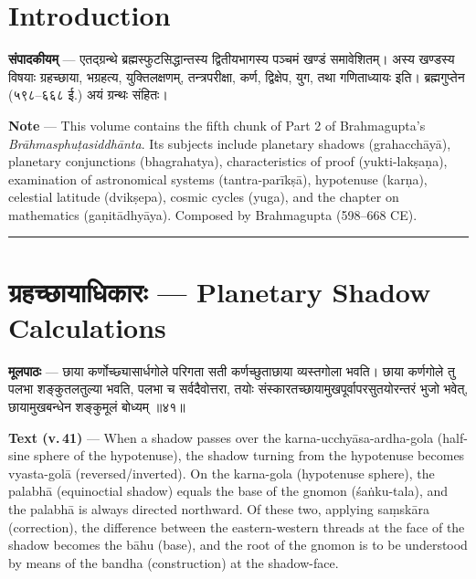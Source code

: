 \documentclass[11pt,a4paper]{article}
\newcommand{\dev}[1]{{\devanagarifont #1}}
\newenvironment{bilingual}{%
  \par\noindent
  \begin{minipage}[t]{0.47\textwidth}%
}{%
  \par\end{minipage}%
}
\newcommand{\rightcol}{%
  \par\end{minipage}%
  \hfill
  \begin{minipage}[t]{0.47\textwidth}%
}
\begin{document}
\section*{Introduction}

\begin{bilingual}
\textbf{संपादकीयम्} --- एतद्ग्रन्थे ब्रह्मस्फुटसिद्धान्तस्य द्वितीयभागस्य पञ्चमं खण्डं समावेशितम्। अस्य खण्डस्य विषयाः ग्रहच्छाया, भग्रहत्य, युक्तिलक्षणम्, तन्त्रपरीक्षा, कर्ण, द्विक्षेप, युग, तथा गणिताध्यायः इति। ब्रह्मगुप्तेन (५९८--६६८ ई.) अयं ग्रन्थः संहितः।
\rightcol
\textbf{Note} --- This volume contains the fifth chunk of Part 2 of Brahmagupta's \textit{Brāhmasphuṭasiddhānta}. Its subjects include planetary shadows (grahacchāyā), planetary conjunctions (bhagrahatya), characteristics of proof (yukti-lakṣaṇa), examination of astronomical systems (tantra-parīkṣā), hypotenuse (karṇa), celestial latitude (dvikṣepa), cosmic cycles (yuga), and the chapter on mathematics (gaṇitādhyāya). Composed by Brahmagupta (598--668 CE).
\end{bilingual}

\medskip
\noindent\rule{\textwidth}{0.4pt}


\section[\dev{ग्रहच्छायाधिकारः}]{\dev{ग्रहच्छायाधिकारः} --- Planetary Shadow Calculations}

\begin{bilingual}
\textbf{मूलपाठः} --- छाया कर्णोच्छ्यासार्धगोले परिगता सती कर्णच्छुताछाया व्यस्तगोला भवति। छाया कर्णगोले तु पलभा शङ्कुतलतुल्या भवति, पलभा च सर्वदैवोत्तरा, तयोः संस्कारतच्छायामुखपूर्वापरसुतयोरन्तरं भुजो भवेत्, छायामुखबन्धेन शङ्कुमूलं बोध्यम् ॥४१॥
\rightcol
\textbf{Text (v.\,41)} --- When a shadow passes over the karna-ucchyāsa-ardha-gola (half-sine sphere of the hypotenuse), the shadow turning from the hypotenuse becomes vyasta-golā (reversed/inverted). On the karna-gola (hypotenuse sphere), the palabhā (equinoctial shadow) equals the base of the gnomon (śaṅku-tala), and the palabhā is always directed northward. Of these two, applying saṃskāra (correction), the difference between the eastern-western threads at the face of the shadow becomes the bāhu (base), and the root of the gnomon is to be understood by means of the bandha (construction) at the shadow-face.
\end{bilingual}
\end{document}

